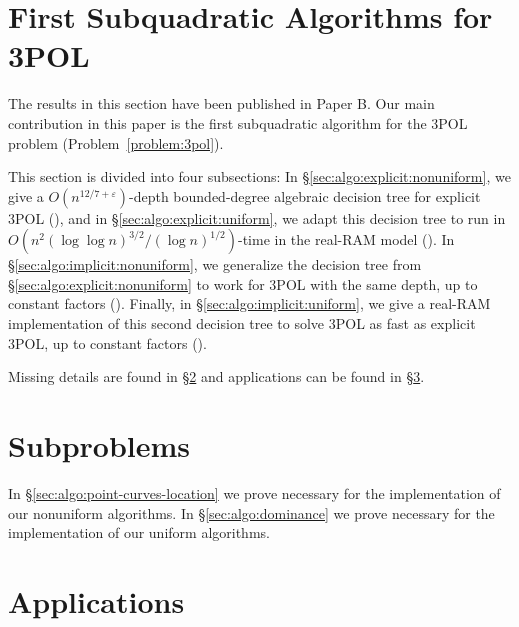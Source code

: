 \section{First Subquadratic Algorithms for 3POL}

The results in this section have been published in Paper B.
Our main contribution in this paper is the first subquadratic algorithm for
the 3POL problem (Problem~\ref{problem:3pol}).

This section is divided into four subsections:
%
In \S\ref{sec:algo:explicit:nonuniform},
we give a $O(n^{12/7+\varepsilon})$-depth bounded-degree
algebraic decision tree for explicit 3POL (), and in
\S\ref{sec:algo:explicit:uniform}, we adapt this decision tree
to run in $O(n^2 {(\log \log n)}^{3/2} / {(\log n)}^{1/2})$-time
in the real-RAM model ().
%
In \S\ref{sec:algo:implicit:nonuniform}, we generalize the decision tree from
\S\ref{sec:algo:explicit:nonuniform} to work for 3POL with the same depth, up
to constant factors ().
%
Finally, in \S\ref{sec:algo:implicit:uniform}, we give a real-RAM
implementation of this second decision tree to solve 3POL as fast as
explicit 3POL, up to constant factors ().

Missing details are found in
\S\ref{paper:3pol-algorithm:subproblems}
and applications can be found in \S\ref{sec:applications}.






\section{Subproblems}\label{paper:3pol-algorithm:subproblems}

In \S\ref{sec:algo:point-curves-location} we prove  necessary for the
implementation of our nonuniform algorithms.
%
In \S\ref{sec:algo:dominance} we prove  necessary for the
implementation of our uniform algorithms.




\section{Applications}%
\label{sec:applications}




